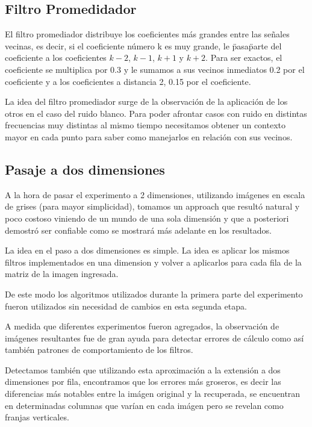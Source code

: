 \subsection{Filtro Promedidador}

El filtro promediador distribuye los coeficientes m\'as grandes 
entre las se\~nales vecinas, es decir, si el coeficiente n\'umero k es muy 
grande, le \"pasa\" parte del coeficiente a los coeficientes $k-2$, $k-1$, $k+1$ y
$k+2$. Para ser exactos, el coeficiente se multiplica por 0.3 y le sumamos a sus 
vecinos inmediatos 0.2 por el coeficiente y a los coeficientes a distancia 2, 0.15 
por el coeficiente.

La idea del filtro promediador surge de la observaci\'on de la aplicaci\'on de
los otros en el caso del ruido blanco. Para poder afrontar casos con ruido en
distintas frecuencias muy distintas al mismo tiempo necesitamos obtener un
contexto mayor en cada punto para saber como manejarlos en relaci\'on con sus
vecinos.

\subsection{Pasaje a dos dimensiones}

A la hora de pasar el experimento a 2 dimensiones, utilizando im\'agenes en
escala de grises (para mayor simplicidad), tomamos un approach que result\'o
natural y poco costoso viniendo de un mundo de una sola dimensi\'on y que a
posteriori demostr\'o ser confiable como se mostrar\'a m\'as adelante en los
resultados.

La idea en el paso a dos dimensiones es simple. La idea es aplicar los mismos
filtros implementados en una dimension y volver a aplicarlos para cada fila de
la matriz de la imagen ingresada.

De este modo los algoritmos utilizados durante la primera parte del experimento
fueron utilizados sin necesidad de cambios en esta segunda etapa.

A medida que diferentes experimentos fueron agregados, la observaci\'on de
im\'agenes resultantes fue de gran ayuda para detectar errores de c\'alculo como
as\'i tambi\'en patrones de comportamiento de los filtros.

Detectamos tambi\'en que utilizando esta aproximaci\'on a la extensi\'on a dos
dimensiones por fila, encontramos que los errores m\'as groseros, es decir las
diferencias m\'as notables entre la im\'agen original y la recuperada, se
encuentran en determinadas columnas que var\'ian en cada im\'agen pero se
revelan como franjas verticales.
